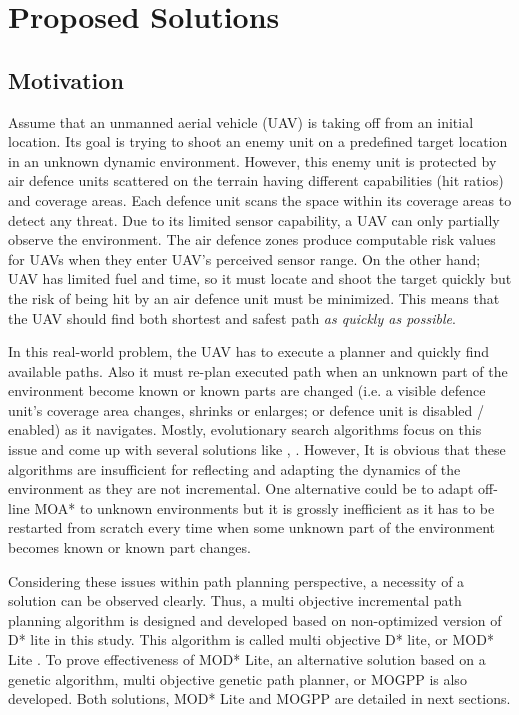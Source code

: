 \chapter{Proposed Solutions}
\label{chapter:proposedAlgorithm}

\section{Motivation}
Assume that an unmanned aerial vehicle (UAV) is taking off from an initial location. Its goal is trying to shoot an enemy unit on a predefined target location in an unknown dynamic environment. However, this enemy unit is protected by air defence units scattered on the terrain having different capabilities (hit ratios) and coverage areas. Each defence unit scans the space within its coverage areas to detect any threat. Due to its limited sensor capability, a UAV can only partially observe the environment. The air defence zones produce computable risk values for UAVs when they enter UAV's perceived sensor range. On the other hand; UAV has limited fuel and time, so it must locate and shoot the target quickly but the risk of being hit by an air defence unit must be minimized. This means that the UAV should find both shortest and safest path \textit{as quickly as possible}.

In this real-world problem, the UAV has to execute a planner and quickly find available paths. Also it must re-plan executed path when an unknown part of the environment become known or known parts are changed (i.e. a visible defence unit's coverage area changes, shrinks or enlarges; or defence unit is disabled / enabled) as it navigates. Mostly, evolutionary search algorithms focus on this issue and come up with several solutions like \cite{Peng_Xu_Zhang:2011}, \cite{Foo_Knutzon:2009}. However, It is obvious that these algorithms are insufficient for reflecting and adapting the dynamics of the environment as they are not incremental. One alternative could be to adapt off-line MOA* to unknown environments but it is grossly inefficient as it has to be restarted from scratch every time when some unknown part of the environment becomes known or known part changes.

Considering these issues within path planning perspective, a necessity of a solution can be observed clearly. Thus, a multi objective incremental path planning algorithm is designed and developed based on non-optimized version of D* lite \cite{Koenig:2002} in this study. This algorithm is called multi objective D* lite, or MOD* Lite \cite{Oral:2012}. To prove effectiveness of MOD* Lite,  an alternative solution based on a genetic algorithm, multi objective genetic path planner, or MOGPP is also developed. Both solutions, MOD* Lite and MOGPP are detailed in next sections.

